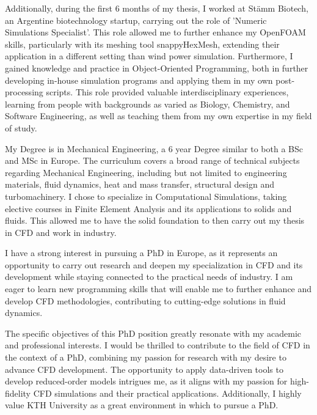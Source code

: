\documentclass{letter}
\begin{document}
\begin{letter}{}
Additionally, during the first 6 months of my thesis, I worked at Stämm Biotech, an Argentine biotechnology startup, carrying out the role of 'Numeric Simulations Specialist'. 
  This role allowed me to further enhance my OpenFOAM skills, particularly with its meshing tool snappyHexMesh, extending their application in a different setting than wind power simulation. 
  Furthermore, I gained knowledge and practice in Object-Oriented Programming, both in further developing in-house simulation programs and applying them in my own post-processing scripts. 
  This role provided valuable interdisciplinary experiences, learning from people with backgrounds as varied as Biology, Chemistry, and Software Engineering, as well as teaching them from my own expertise in my field of study.

My Degree is in Mechanical Engineering, a 6 year Degree similar to both a BSc and MSc in Europe.
The curriculum covers a broad range of technical subjects regarding Mechanical Engineering, including but not limited to engineering materials, fluid dynamics, heat and mass transfer, structural design and turbomachinery. 
I chose to specialize in Computational Simulations, taking elective courses in Finite Element Analysis and its applications to solids and fluids.
This allowed me to have the solid foundation to then carry out my thesis in CFD and work in industry.
  
I have a strong interest in pursuing a PhD in Europe, as it represents an opportunity to carry out research and deepen my specialization in CFD and its development while staying connected to the practical needs of industry.
   I am eager to learn new programming skills that will enable me to further enhance and develop CFD methodologies, contributing to cutting-edge solutions in fluid dynamics.

The specific objectives of this PhD position greatly resonate with my academic and professional interests. 
    I would be thrilled to contribute to the field of CFD in the context of a PhD, combining my passion for research with my desire to advance CFD development. 
    The opportunity to apply data-driven tools to develop reduced-order models intrigues me, as it aligns with my passion for high-fidelity CFD simulations and their practical applications. 
    Additionally, I highly value KTH University as a great environment in which to pursue a PhD.



\end{letter}
\end{document}
